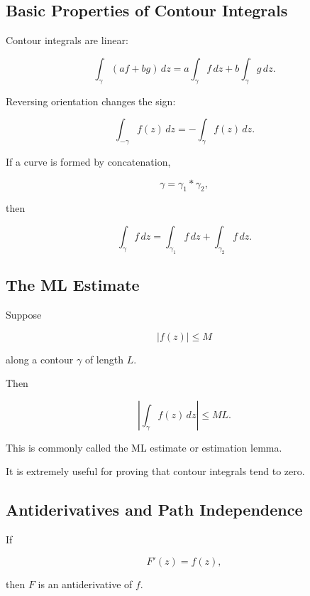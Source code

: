 \subsection{Basic Properties of Contour Integrals}
\label{subsec:properties-contour-integrals}

Contour integrals are linear:

\[
\boxed{
\int_\gamma(af+bg)\,dz
=
a\int_\gamma f\,dz
+
b\int_\gamma g\,dz.
}
\]

Reversing orientation changes the sign:

\[
\boxed{
\int_{-\gamma}f(z)\,dz
=
-\int_\gamma f(z)\,dz.
}
\]

If a curve is formed by concatenation,

\[
\gamma=\gamma_1*\gamma_2,
\]

then

\[
\boxed{
\int_\gamma f\,dz
=
\int_{\gamma_1}f\,dz
+
\int_{\gamma_2}f\,dz.
}
\]

\subsection{The ML Estimate}
\label{subsec:ml-estimate}

Suppose

\[
|f(z)|\leq M
\]

along a contour \(\gamma\) of length \(L\).

Then

\[
\boxed{
\left|
\int_\gamma f(z)\,dz
\right|
\leq
ML.
}
\]

This is commonly called the ML estimate or estimation lemma.

It is extremely useful for proving that contour integrals tend to zero.

\subsection{Antiderivatives and Path Independence}
\label{subsec:complex-antiderivatives}

If

\[
F'(z)=f(z),
\]

then \(F\) is an antiderivative of \(f\).

